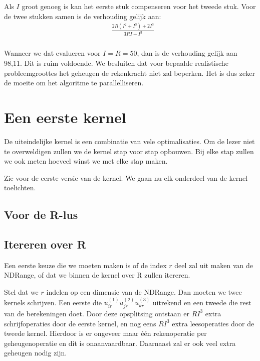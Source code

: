Als $I$ groot genoeg is kan het eerste stuk compenseren voor het tweede stuk. Voor de twee stukken samen is de verhouding gelijk aan:
\begin{align*}
    & \frac{2R (I^2 + I^3) + 2I^3}{3RI + I^3}\\
\end{align*}

Wanneer we dat evalueren voor $I = R = 50$, dan is de verhouding gelijk aan 98,11. Dit is ruim voldoende. We besluiten dat voor bepaalde realistische probleemgroottes het geheugen de rekenkracht niet zal beperken. Het is dus zeker de moeite om het algoritme te parallelliseren.

\section{Een eerste kernel}
De uiteindelijke kernel is een combinatie van vele optimalisaties. Om de lezer niet te overweldigen zullen we de kernel stap voor stap opbouwen. Bij elke stap zullen we ook meten hoeveel winst we met elke stap maken.

Zie  voor de eerste versie van de kernel. We gaan nu elk onderdeel van de kernel toelichten.

\subsection{Voor de R-lus}


\subsection{Itereren over R}
Een eerste keuze die we moeten maken is of de index $r$ deel zal uit maken van de NDRange, of dat we binnen de kernel over R zullen itereren.

Stel dat we $r$ indelen op een dimensie van de NDRange. Dan moeten we twee kernels schrijven. Een eerste die $u^{(1)}_{i r} u^{(2)}_{j r} u^{(3)}_{k r}$ uitrekend en een tweede die rest van de berekeningen doet. Door deze opsplitsing ontstaan er $RI^3$ extra schrijfoperaties door de eerste kernel, en nog eens $RI^3$ extra leesoperaties door de tweede kernel. Hierdoor is er ongeveer maar \'e\'en rekenoperatie per geheugenoperatie en dit is onaanvaardbaar. Daarnaast zal er ook veel extra geheugen nodig zijn.

